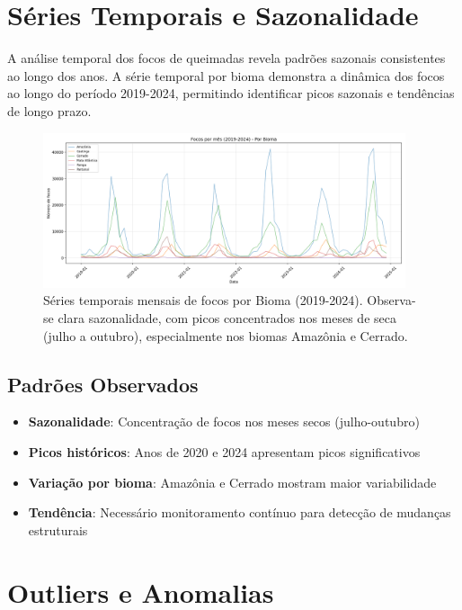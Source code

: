\documentclass[12pt,a4paper]{report}
\begin{document}
\section{Séries Temporais e Sazonalidade}

A análise temporal dos focos de queimadas revela padrões sazonais consistentes ao longo dos anos. A série temporal por bioma demonstra a dinâmica dos focos ao longo do período 2019-2024, permitindo identificar picos sazonais e tendências de longo prazo.

\begin{figure}[h]
\centering
\includegraphics[width=0.95\textwidth]{../figs/eda/series_bioma.png}
\caption{Séries temporais mensais de focos por Bioma (2019-2024). Observa-se clara sazonalidade, com picos concentrados nos meses de seca (julho a outubro), especialmente nos biomas Amazônia e Cerrado.}
\label{fig:series_bioma}
\end{figure}

\subsection{Padrões Observados}

\begin{itemize}
  \item \textbf{Sazonalidade}: Concentração de focos nos meses secos (julho-outubro)
  \item \textbf{Picos históricos}: Anos de 2020 e 2024 apresentam picos significativos
  \item \textbf{Variação por bioma}: Amazônia e Cerrado mostram maior variabilidade
  \item \textbf{Tendência}: Necessário monitoramento contínuo para detecção de mudanças estruturais
\end{itemize}

\section{Outliers e Anomalias}
\end{document}
